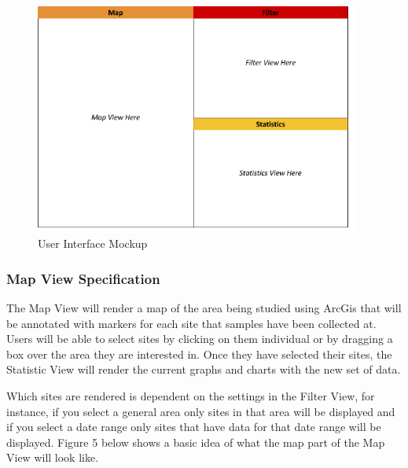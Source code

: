 \begin{figure}[h]
	\centering
	\includegraphics[width=0.95\textwidth]{Overview.png}
	\captionsetup{justification=centering}
	\caption{
		User Interface Mockup
	}
	\label{fig:overview}
\end{figure}


\subsubsection{Map View Specification}
The Map View will render a map of the area being studied using ArcGis that will be annotated with markers for each site that samples have been collected at. Users will be able to select sites by clicking on them individual or by dragging a box over the area they are interested in. Once they have selected their sites, the Statistic View will render the current graphs and charts with the new set of data.

Which sites are rendered is dependent on the settings in the Filter View, for instance, if you select a general area only sites in that area will be displayed and if you select a date range only sites that have data for that date range will be displayed. Figure 5 below shows a basic idea of what the map part of the Map View will look like.

